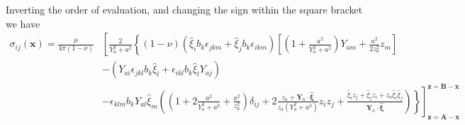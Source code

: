 Inverting the order of evaluation, and changing the sign within the square bracket we have
{\small
\begin{align}
\sigma_{ij}(\bm x)
=\frac{\mu}{4\pi(1-\nu)}&\left[\frac{2}{Y_a^2+a^2}\left\{(1-\nu)\left(\hat{\xi}_ib_k\epsilon_{jkm}+\hat{\xi}_jb_k\epsilon_{ikm}\right)\left[\left(1+\frac{a^2}{Y_a^2+a^2}\right)Y_{am}+\frac{a^2}{2z_a^2 }z_m\right]\right.\right.\nonumber\\
&-(Y_{ai}\epsilon_{jkl}b_k\hat{\xi}_l+\epsilon_{ikl}b_k\hat{\xi}_lY_{aj})\nonumber\\
&\left.\left.-\epsilon_{klm}b_kY_{al}\hat{\xi}_m\left(\left(1+2\frac{a^2}{Y_a^2+a^2}+\frac{a^2}{z_a^2 }\right)\delta_{ij}+2\frac{z_a+\bm Y_a\cdot \hat{\bm \xi}}{z_a(Y_a^2+a^2)}z_iz_j+\frac{\hat{\xi}_iz_j+\hat{\xi}_jz_i+z_a\hat{\xi}_i\hat{\xi}_j}{\bm Y_a\cdot \hat{\bm \xi}}\right)
\right\}\right]^{\bm z=\bm B-\bm x}_{\bm z=\bm A-\bm x}
%
\end{align}
}

